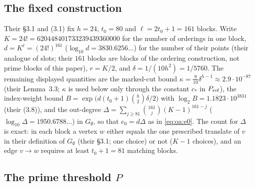 \subsection{The fixed construction}\label{subsec:oa:fixed}

Their \S3.1 and (3.1) fix $h=24$, $t_0=80$ and
$\ell=2t_0+1=161$ blocks. Write $K=24!=620448401733239439360000$
for the number of orderings in one block, $d=K^\ell=(24!)^{161}$
($\log_{10}d=3830.6256\ldots$) for the number of their points
(their analogue of slots; their $161$ blocks are blocks of the
ordering construction, not prime blocks of this paper),
$r=K/2$, and $\delta=1/(10h^2)=1/5760$. The remaining displayed
quantities are the marked-cut bound
$\kappa=\tfrac9{10}\delta^{h-1}\approx2.9\cdot10^{-87}$ (their
Lemma~3.3; $\kappa$ is used below only through the constant $c_*$
in $P_{\rm ref}$), the index-weight bound
$B=\exp\bigl(d(t_0+1)\binom h2\delta/2\bigr)$ with
$\log_2B=1.1823\cdot10^{3831}$ (their (3.8)), and the out-degree
$\Delta=\sum_{j\ge81}\binom{161}{j}(K-1)^{161-j}$
($\log_{10}\Delta=1950.6788\ldots$) in $G_\emptyset$, so that
$e_0=d\Delta$ as in \eqref{eq:oa:e0}. The count for $\Delta$ is
exact: in each block a vertex $w$ either equals the one
prescribed translate of $v$ in their definition of
$G_\emptyset$ (their \S3.1; one choice) or not ($K-1$ choices),
and an edge
$v\to w$ requires at least $t_0+1=81$ matching blocks.

\subsection{The prime threshold \texorpdfstring{$P$}{P}}\label{subsec:oa:P}

